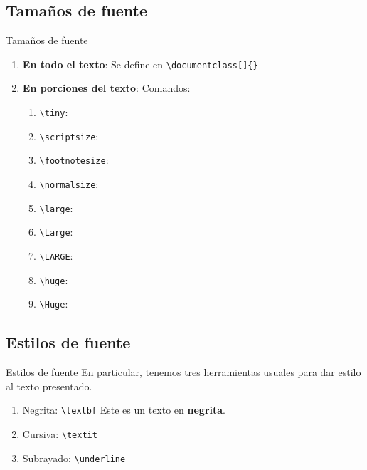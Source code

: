 \documentclass[../slides.tex]{subfiles}
\begin{document}
    \begin{frame}
        \tableofcontents[sections=\value{section}]
    \end{frame}
    
    \subsection{Tamaños de fuente}
    \begin{frame}{Tamaños de fuente}
        \begin{enumerate}
            \item \textbf{En todo el texto}: Se define en \texttt{\textbackslash documentclass[]\{\}}

            \item \textbf{En porciones del texto}:
                Comandos:
                \begin{enumerate}
                    \item \texttt{\textbackslash tiny}:
                    \item \texttt{\textbackslash scriptsize}:
                    \item \texttt{\textbackslash footnotesize}:
                    \item \texttt{\textbackslash normalsize}:
                    \item \texttt{\textbackslash large}:
                    \item \texttt{\textbackslash Large}:
                    \item \texttt{\textbackslash LARGE}:
                    \item \texttt{\textbackslash huge}:
                    \item \texttt{\textbackslash Huge}:
                \end{enumerate}
                
        \end{enumerate}
    \end{frame}
        
    \subsection{Estilos de fuente}
    \begin{frame}{Estilos de fuente}
        En particular, tenemos tres herramientas usuales para dar estilo al texto presentado.
            \begin{enumerate}
                \item Negrita: \texttt{\textbackslash textbf} Este es un texto en \textbf{negrita}.
                    
                \item Cursiva: \texttt{\textbackslash textit}
                \item Subrayado: \texttt{\textbackslash underline}
            \end{enumerate}
    \end{frame}
\end{document}
